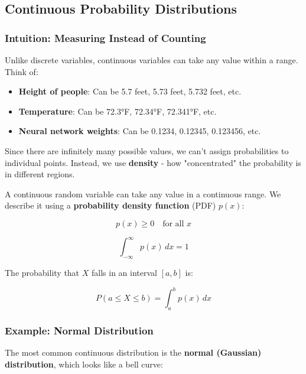 \subsection{Continuous Probability Distributions}

\subsubsection{Intuition: Measuring Instead of Counting}

Unlike discrete variables, continuous variables can take any value within a range. Think of:
\begin{itemize}
    \item \textbf{Height of people}: Can be 5.7 feet, 5.73 feet, 5.732 feet, etc.
    \item \textbf{Temperature}: Can be 72.3°F, 72.34°F, 72.341°F, etc.
    \item \textbf{Neural network weights}: Can be 0.1234, 0.12345, 0.123456, etc.
\end{itemize}

Since there are infinitely many possible values, we can't assign probabilities to individual points. Instead, we use \textbf{density} - how "concentrated" the probability is in different regions.

A continuous random variable can take any value in a continuous range. We describe it using a \textbf{probability density function} (PDF) $p(x)$:

\begin{equation}
p(x) \geq 0 \quad \text{for all } x
\end{equation}

\begin{equation}
\int_{-\infty}^{\infty} p(x) \, dx = 1
\end{equation}

The probability that $X$ falls in an interval $[a, b]$ is:

\begin{equation}
P(a \leq X \leq b) = \int_a^b p(x) \, dx
\end{equation}

\subsubsection{Example: Normal Distribution}

The most common continuous distribution is the \textbf{normal (Gaussian) distribution}, which looks like a bell curve:

